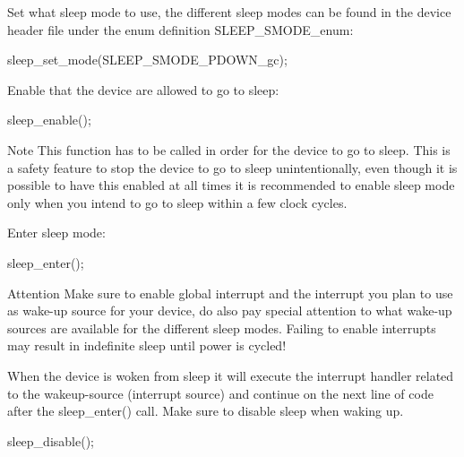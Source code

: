 \begin{DoxyEnumerate}
\item Set what sleep mode to use, the different sleep modes can be found in the device header file under the enum definition S\-L\-E\-E\-P\-\_\-\-S\-M\-O\-D\-E\-\_\-enum\-:
\begin{DoxyItemize}
\item 
\begin{DoxyCode}
 sleep\_set\_mode(SLEEP\_SMODE\_PDOWN\_gc); 
\end{DoxyCode}

\end{DoxyItemize}
\item Enable that the device are allowed to go to sleep\-:
\begin{DoxyItemize}
\item 
\begin{DoxyCode}
 sleep\_enable(); 
\end{DoxyCode}

\item \begin{DoxyNote}{Note}
This function has to be called in order for the device to go to sleep. This is a safety feature to stop the device to go to sleep unintentionally, even though it is possible to have this enabled at all times it is recommended to enable sleep mode only when you intend to go to sleep within a few clock cycles.
\end{DoxyNote}

\end{DoxyItemize}
\item Enter sleep mode\-:
\begin{DoxyItemize}
\item 
\begin{DoxyCode}
 sleep\_enter(); 
\end{DoxyCode}

\item \begin{DoxyAttention}{Attention}
Make sure to enable global interrupt and the interrupt you plan to use as wake-\/up source for your device, do also pay special attention to what wake-\/up sources are available for the different sleep modes. Failing to enable interrupts may result in indefinite sleep until power is cycled!
\end{DoxyAttention}

\end{DoxyItemize}
\item When the device is woken from sleep it will execute the interrupt handler related to the wakeup-\/source (interrupt source) and continue on the next line of code after the sleep\-\_\-enter() call. Make sure to disable sleep when waking up.
\begin{DoxyItemize}
\item 
\begin{DoxyCode}
 sleep\_disable(); 
\end{DoxyCode}


\end{DoxyItemize}
\end{DoxyEnumerate}
